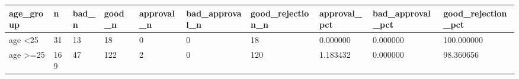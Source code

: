 \begin{tabular}{llllllllll}
\hline
age\_group & n & bad\_n & good\_n & approval\_n & bad\_approval\_n & good\_rejection\_n & approval\_pct & bad\_approval\_pct & good\_rejection\_pct \\
\hline
age <25 & 31 & 13 & 18 & 0 & 0 & 18 & 0.000000 & 0.000000 & 100.000000 \\
age >=25 & 169 & 47 & 122 & 2 & 0 & 120 & 1.183432 & 0.000000 & 98.360656 \\
\hline
\end{tabular}

